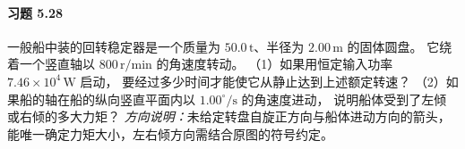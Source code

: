 \paragraph{习题 5.28}
一般船中装的回转稳定器是一个质量为
\(50.0\,\mathrm t\)、半径为 \(2.00\,\mathrm m\) 的固体圆盘。
它绕着一个竖直轴以 \(800\,\mathrm{r/min}\)
的角速度转动。
（1）如果用恒定输入功率
\(7.46\times10^4\,\mathrm W\) 启动，
要经过多少时间才能使它从静止达到上述额定转速？
（2）如果船的轴在船的纵向竖直平面内以
\(1.00^\circ/\mathrm s\) 的角速度进动，
说明船体受到了左倾或右倾的多大力矩？
\textit{方向说明：}未给定转盘自旋正方向与船体进动方向的箭头，
能唯一确定力矩大小，左右倾方向需结合原图的符号约定。

